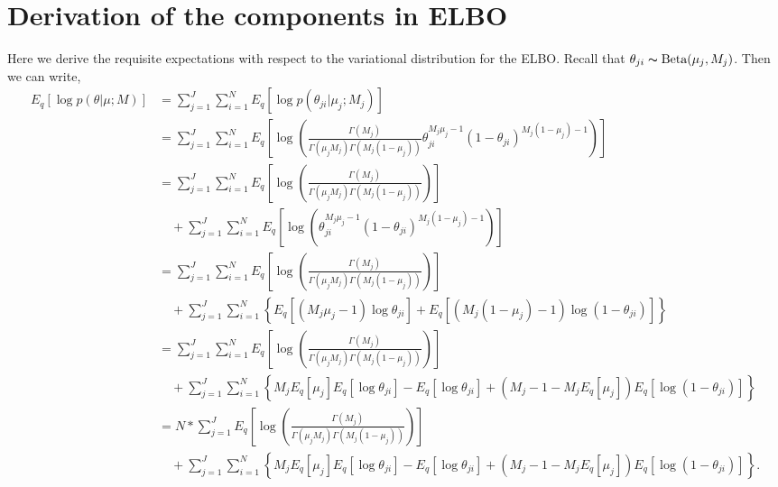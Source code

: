 \documentclass[11pt,reqno]{amsart}
\begin{document}
\section{Derivation of the components in ELBO}
\label{appendix:ELBO}
Here we derive the requisite expectations with respect to the variational distribution for the ELBO.
%
Recall that $\theta_{ji} \thicksim \text{Beta}(\mu_j, M_j)$.
Then we can write,
\begin{equation}
\begin{split}
E_q \left[ \log p\left(\theta | \mu; M \right)\right] &= \sum_{j=1}^{J} \sum_{i=1}^{N} E_q \left[ \log p\left(\theta_{ji} | \mu_j; M_j \right)\right] \\
&= \sum_{j=1}^{J} \sum_{i=1}^{N}  E_q  \left[ \log \left( \frac{ \Gamma(M_j) } { \Gamma(\mu_j M_j) \Gamma(M_j (1-\mu_j)) } \theta_{ji}^{M_j\mu_j -1} (1 - \theta_{ji})^{M_j ( 1 - \mu_j) - 1} \right) \right] \\
&= \sum_{j=1}^{J} \sum_{i=1}^{N} E_q  \left[ \log \left( \frac{ \Gamma(M_j) } { \Gamma(\mu_j M_j) \Gamma(M_j (1-\mu_j)) }\right) \right] \\
&\quad + \sum_{j=1}^{J} \sum_{i=1}^{N}  E_q  \left[ \log \left( \theta_{ji}^{M_j\mu_j -1} (1 - \theta_{ji})^{M_j ( 1 - \mu_j) - 1} \right) \right] \\
&= \sum_{j=1}^{J} \sum_{i=1}^{N} E_q  \left[ \log \left( \frac{ \Gamma(M_j) } { \Gamma(\mu_j M_j) \Gamma(M_j (1-\mu_j)) }\right) \right]  \\
&\quad + \sum_{j=1}^{J} \sum_{i=1}^{N} \left\lbrace E_q \left[ \left( M_j\mu_j -1 \right) \log \theta_{ji} \right] + E_q \left[ \left( M_j ( 1 - \mu_j) - 1 \right) \log \left( 1 - \theta_{ji} \right) \right]\right\rbrace \\
&= \sum_{j=1}^{J} \sum_{i=1}^{N} E_q  \left[ \log \left( \frac{ \Gamma(M_j) } { \Gamma(\mu_j M_j) \Gamma(M_j (1-\mu_j)) }\right) \right] \\
&\quad + \sum_{j=1}^{J} \sum_{i=1}^{N} \left\lbrace M_j E_q \left[ \mu_j \right] E_q \left[ \log \theta_{ji} \right] - E_q  \left[ \log \theta_{ji} \right] + \left( M_j - 1 - M_j E_q\left[ \mu_j \right]  \right) E_q\left[ \log \left( 1 - \theta_{ji}\right) \right] \right\rbrace \\
&= N* \sum_{j=1}^{J} E_q  \left[ \log \left( \frac{ \Gamma(M_j) } { \Gamma(\mu_j M_j) \Gamma(M_j (1-\mu_j)) }\right) \right] \\
&\quad + \sum_{j=1}^{J} \sum_{i=1}^{N} \left\lbrace M_j E_q \left[ \mu_j \right] E_q \left[ \log \theta_{ji} \right] - E_q  \left[ \log \theta_{ji} \right] + \left( M_j - 1 - M_j E_q\left[ \mu_j \right]  \right) E_q\left[ \log \left( 1 - \theta_{ji}\right) \right] \right\rbrace.
\end{split}
\end{equation}
\end{document}
